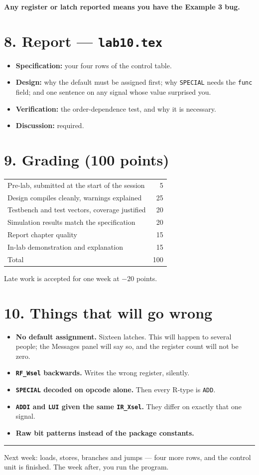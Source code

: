 \documentclass[11pt]{article}
\newcommand{\code}[1]{\texttt{#1}}
\newcommand{\hr}{\vspace{2pt}\hrule\vspace{6pt}}
\begin{document}
\textbf{Any register or latch reported means you have the Example 3 bug.}

\section*{8. Report --- \code{lab10.tex}}

\begin{itemize}[leftmargin=1.6em,itemsep=1pt]
\item \textbf{Specification:} your four rows of the control table.
\item \textbf{Design:} why the default must be assigned first; why
\code{SPECIAL} needs the \code{func} field; and one sentence on any signal whose
value surprised you.
\item \textbf{Verification:} the order-dependence test, and why it is necessary.
\item \textbf{Discussion:} required.
\end{itemize}

\section*{9. Grading (100 points)}

\begin{center}
\begin{tabular}{lr}
\toprule
Pre-lab, submitted at the start of the session & 5 \\
Design compiles cleanly, warnings explained & 25 \\
Testbench and test vectors, coverage justified & 20 \\
Simulation results match the specification & 20 \\
Report chapter quality & 15 \\
In-lab demonstration and explanation & 15 \\
\midrule
Total & 100 \\
\bottomrule
\end{tabular}
\end{center}

Late work is accepted for one week at $-20$ points.

\section*{10. Things that will go wrong}

\begin{itemize}[leftmargin=1.6em,itemsep=1pt]
\item \textbf{No default assignment.} Sixteen latches. This will happen to
several people; the Messages panel will say so, and the register count will not
be zero.
\item \textbf{\code{RF\_Wsel} backwards.} Writes the wrong register, silently.
\item \textbf{\code{SPECIAL} decoded on opcode alone.} Then every R-type is
\code{ADD}.
\item \textbf{\code{ADDI} and \code{LUI} given the same \code{IR\_Xsel}.} They
differ on exactly that one signal.
\item \textbf{Raw bit patterns instead of the package constants.}
\end{itemize}

\vspace{10pt}
\hr
{\small Next week: loads, stores, branches and jumps --- four more rows, and the
control unit is finished. The week after, you run the program.}
\end{document}
